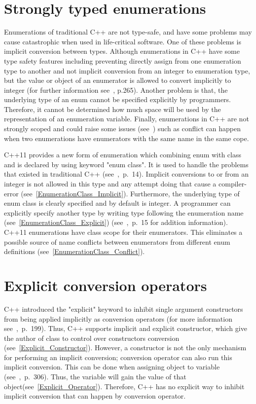 \documentclass[11pt]{report}
\begin{document}
\section{Strongly typed enumerations}
\label{section: Strongly typed enumerations}
Enumerations of traditional C++ are not type-safe, and have some problems may cause catastrophic when used in life-critical software. One of these problems is implicit conversion between types. Although enumerations in C++ have some type safety features including preventing directly assign from one enumeration type to another and not implicit conversion from an integer to enumeration type, but the value or object of an enumerator is allowed to convert implicitly to integer (for further information see~\cite{Overland:2011:CWF}, p.265). Another problem is that, the underlying type of an enum cannot be specified explicitly by programmers. Therefore, it cannot be determined how much space will be used by the representation of an enumeration variable. Finally, enumerations in C++ are not strongly scoped and could raise some issues (see~\cite{Stroustrup:2012:Cpp11}) such as conflict can happen when two enumerations have enumerators with the same name in the same cope.

C++11 provides a new form of enumeration which combining enum with class and is declared by using keyword "enum class". It is used to handle the problems that existed in traditional C++ (see~\cite{Gregorie:professionalcpp},~p.~14). Implicit conversions to or from an integer is not allowed in this type and any attempt doing that cause a compiler-error (see~\ref{EnumerationClass_Implicit}). Furthermore, the underlying type of enum class is clearly specified and by default is integer. A programmer can explicitly specify another type by writing type following the enumeration name (see~\ref{EnumerationClass_Explicit}) (see~\cite{Gregorie:professionalcpp},~p.~15 for addition information). C++11 enumerations have class scope for their enumerators. This eliminates a possible source of name conflicts between enumerators from different enum definitions (see~\ref{EnumerationClass_Conflict}).

\section{Explicit conversion operators}
\label{section: Explicit Conversion Operators}
C++ introduced the "explicit" keyword to inhibit single argument constructors from being applied implicitly as conversion operators (for more information see~\cite{Gregorie:professionalcpp},~p.~199). Thus, C++ supports implicit and explicit constructor, which give the author of class to control over constructors conversion (see~\ref{Explicit_Constructor}). However, a constructor is not the only mechanism for performing an implicit conversion; conversion operator can also run this implicit conversion. This can be done when assigning object to variable (see~\cite{Gregorie:professionalcpp},~p.~306). Thus, the variable will gain the value of that object(see~\ref{Explicit_Operator}). Therefore, C++ has no explicit way to inhibit implicit conversion that can happen by conversion operator.
\end{document}
